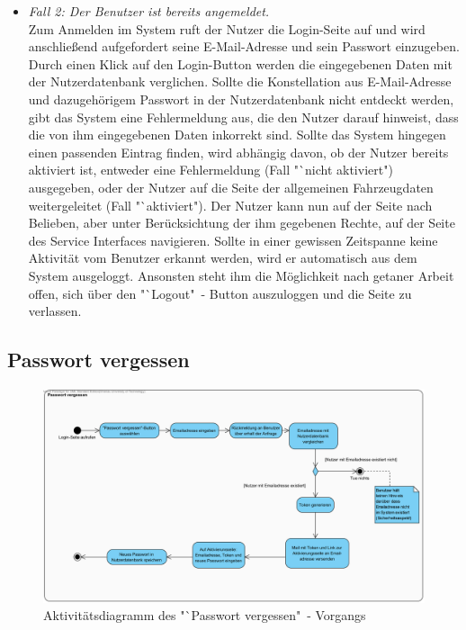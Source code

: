 \documentclass[fontsize = 12pt, paper = a4]{scrreprt}
\begin{document}
\begin{itemize}

\item \textit{Fall 2: Der Benutzer ist bereits angemeldet.} \\ 
Zum Anmelden im System ruft der Nutzer die Login-Seite auf und wird anschließend aufgefordert seine E-Mail-Adresse und sein Passwort einzugeben. Durch einen Klick auf den Login-Button werden die eingegebenen Daten mit der Nutzerdatenbank verglichen. Sollte die Konstellation aus E-Mail-Adresse und dazugehörigem Passwort in der Nutzerdatenbank nicht entdeckt werden, gibt das System eine Fehlermeldung aus, die den Nutzer darauf hinweist, dass die von ihm eingegebenen Daten inkorrekt sind. Sollte das System hingegen einen passenden Eintrag finden, wird abhängig davon, ob der Nutzer bereits aktiviert ist, entweder eine Fehlermeldung (Fall "`nicht aktiviert") ausgegeben, oder der Nutzer auf die Seite der allgemeinen Fahrzeugdaten weitergeleitet (Fall "`aktiviert"). Der Nutzer kann nun auf der Seite nach Belieben, aber unter Berücksichtung der ihm gegebenen Rechte, auf der Seite des Service Interfaces navigieren.
Sollte in einer gewissen Zeitspanne keine Aktivität vom Benutzer erkannt werden, wird er automatisch aus dem System ausgeloggt.
Ansonsten steht ihm die Möglichkeit nach getaner Arbeit offen, sich über den "`Logout"\ - Button auszuloggen und die Seite zu verlassen.

\end{itemize}

\newpage

\subsection{Passwort vergessen}

\begin{figure}
\centering
\includegraphics[scale = 0.6]{passwort_vergessen_vorgang}
\caption[Aktivitätsdiagramm Passwort vergessen - Vorgang] {Aktivitätsdiagramm des "`Passwort vergessen"\ - Vorgangs}
\end{figure} 
\end{document}
